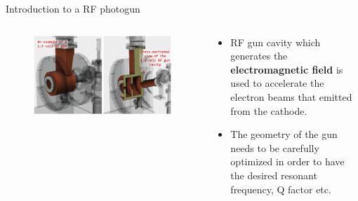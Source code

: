 \documentclass[aspectratio=169]{beamer}
\begin{document}
\begin{frame}{Introduction to a RF photogun}
\begin{columns}
\begin{column}{0.6\textwidth}
    \begin{figure}
    \centering
        \includegraphics[height=0.6\textwidth]{beamline3_3.png}
    \end{figure}
\end{column}
\begin{column}{0.38\textwidth}
\begin{itemize}
    \item RF gun cavity which generates the \textbf{electromagnetic field} is used to accelerate the electron beams that emitted from the cathode. 
    \item The geometry of the gun needs to be carefully optimized in order to have the desired resonant frequency, Q factor etc.
\end{itemize}
\end{column}
\end{columns}
\end{frame}
\end{document}
